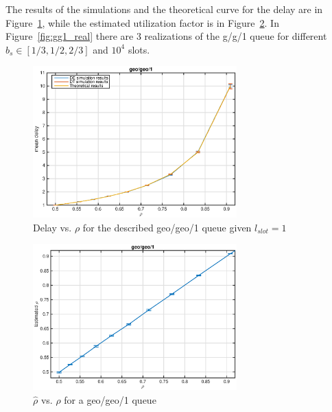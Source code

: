 \documentclass[10pt]{article}
\begin{document}
The results of the simulations and the theoretical curve for the delay are in Figure~\ref{fig:gg1_dl}, while the estimated utilization factor is in Figure~\ref{fig:gg1_rho}. In Figure~\ref{fig:gg1_real} there are 3 realizations of the g/g/1 queue for different $b_s \in [1/3, 1/2, 2/3]$ and $10^4$ slots.

\begin{figure}[h!]
	\centering
	\includegraphics[width = 0.7\textwidth]{gg1_dl}
	\caption{Delay vs. $\rho$ for the described geo/geo/1 queue given $l_{slot} = 1$}
	\label{fig:gg1_dl}
\end{figure}

\begin{figure}[h!]
	\centering
	\includegraphics[width = 0.7\textwidth]{gg1_rho}
	\caption{$\hat{\rho}$ vs. $\rho$ for a geo/geo/1 queue}
	\label{fig:gg1_rho}
\end{figure}

\clearpage
\end{document}
